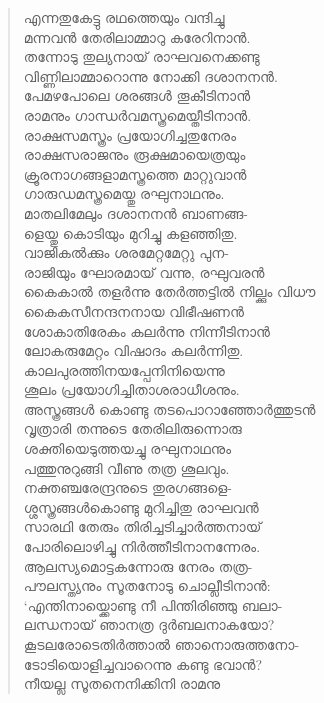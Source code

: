 \begin{verse}
എന്നതുകേട്ടു രഥത്തെയും വന്ദിച്ചു\\
മന്നവന്‍ തേരിലാമ്മാറു കരേറിനാന്‍.\\
തന്നോടു തുല്യനായ് രാഘവനെക്കണ്ടു\\
വിണ്ണിലാമ്മാറൊന്നു നോക്കി ദശാനനന്‍.\\
പേമഴപോലെ ശരങ്ങള്‍ തൂകീടിനാന്‍\\
രാമനും ഗാന്ധര്‍വമസ്ത്രമെയ്തീടിനാന്‍.\\
രാക്ഷസമസ്ത്രം പ്രയോഗിച്ചതുനേരം\\
രാക്ഷസരാജനും രൂക്ഷമായെത്രയും\\
ക്രൂരനാഗങ്ങളാമസ്ത്രത്തെ മാറ്റുവാന്‍\\
ഗാരുഡമസ്ത്രമെയ്തു രഘുനാഥനും.\\
മാതലിമേലും ദശാനനന്‍ ബാണങ്ങ-\\
ളെയ്തു കൊടിയും മുറിച്ചു കളഞ്ഞിതു.\\
വാജികല്‍ക്കും ശരമേറ്റമേറ്റു പുന-\\
രാജിയും ഘോരമായ് വന്നു, രഘുവരന്‍\\
കൈകാല്‍ തളര്‍ന്നു തേര്‍ത്തട്ടില്‍ നില്ക്കും വിധൗ\\
കൈകസീനന്ദനനായ വിഭീഷണന്‍\\
ശോകാതിരേകം കലര്‍ന്നു നിന്നീടിനാന്‍\\
ലോകരുമേറ്റം വിഷാദം കലര്‍ന്നിതു.\\
കാലപുരത്തിനയപ്പേനിനിയെന്നു\\
ശൂലം പ്രയോഗിച്ചിതാശരാധീശനും.\\
അസ്ത്രങ്ങള്‍ കൊണ്ടു തടപൊറാഞ്ഞോര്‍ത്തുടന്‍\\
വൃത്രാരി തന്നുടെ തേരിലിരുന്നൊരു\\
ശക്തിയെടുത്തയച്ചു രഘുനാഥനും\\
പത്തുനുറുങ്ങി വീണു തത്ര ശൂലവും.\\
നക്തഞ്ചരേന്ദ്രനുടെ തുരഗങ്ങളെ-\\
ശ്ശസ്ത്രങ്ങള്‍കൊണ്ടു മുറിച്ചിതു രാഘവന്‍\\
സാരഥി തേരും തിരിച്ചടിച്ചാര്‍ത്തനായ്\\
പോരിലൊഴിച്ചു നിര്‍ത്തീടിനാനന്നേരം.\\
ആലസ്യമൊട്ടകന്നോരു നേരം തത്ര-\\
പൗലസ്ത്യനും സൂതനോടു ചൊല്ലീടിനാന്‍:\\
‘എന്തിനായ്ക്കൊണ്ടു നീ പിന്തിരിഞ്ഞു ബലാ-\\
ലന്ധനായ് ഞാനത്ര ദുര്‍ബലനാകയോ?\\
കൂടലരോടെതിര്‍ത്താല്‍ ഞാനൊരുത്തനോ-\\
ടോടിയൊളിച്ചവാറെന്നു കണ്ടു ഭവാന്‍?\\
നീയല്ല സൂതനെനിക്കിനി രാമനു\\

\end{verse}
